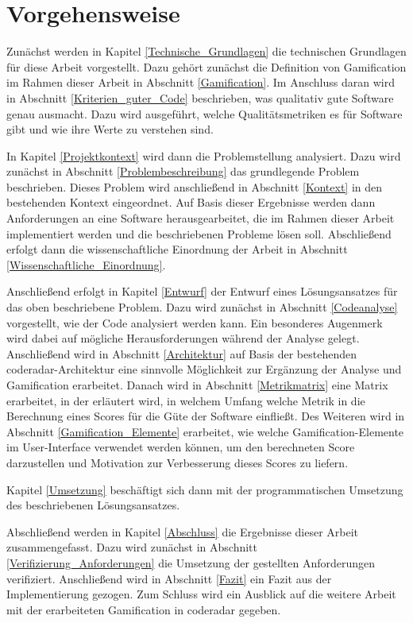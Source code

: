 \documentclass[
	oneside,  %
	ngerman, 
	final, 
	11pt, 
	a4paper, 
	1.1headlines, 
	headinclude=false, 
	footinclude=false, 
	mpinclude=false, 
	pagesize, 
	onecolumn, 
	titlepage, 
	parskip=half, 
	headsepline, 
	chapterprefix=false, 
	version=first, 
	listof=totoc, 
	bibliography=totoc, 
	toc=graduated, 
	fleqn
]{scrbook}
\begin{document}
\section{Vorgehensweise}
\label{Vorgehensweise}
Zunächst werden in Kapitel \ref{Technische_Grundlagen} die technischen Grundlagen für diese Arbeit vorgestellt.
Dazu gehört zunächst die Definition von Gamification im Rahmen dieser Arbeit in Abschnitt \ref{Gamification}.
Im Anschluss daran wird in Abschnitt \ref{Kriterien_guter_Code} beschrieben, was qualitativ gute Software genau ausmacht.
Dazu wird ausgeführt, welche Qualitätsmetriken es für Software gibt und wie ihre Werte zu verstehen sind.

In Kapitel \ref{Projektkontext} wird dann die Problemstellung analysiert.
Dazu wird zunächst in Abschnitt \ref{Problembeschreibung} das grundlegende Problem beschrieben.
Dieses Problem wird anschließend in Abschnitt \ref{Kontext} in den bestehenden Kontext eingeordnet.
Auf Basis dieser Ergebnisse werden dann Anforderungen an eine Software herausgearbeitet, die im Rahmen dieser Arbeit implementiert werden und die beschriebenen Probleme lösen soll.
Abschließend erfolgt dann die wissenschaftliche Einordnung der Arbeit in Abschnitt \ref{Wissenschaftliche_Einordnung}.

Anschließend erfolgt in Kapitel \ref{Entwurf} der Entwurf eines Lösungsansatzes für das oben beschriebene Problem.
Dazu wird zunächst in Abschnitt \ref{Codeanalyse} vorgestellt, wie der Code analysiert werden kann.
Ein besonderes Augenmerk wird dabei auf mögliche Herausforderungen während der Analyse gelegt.
Anschließend wird in Abschnitt \ref{Architektur} auf Basis der bestehenden coderadar-Architektur eine sinnvolle Möglichkeit zur Ergänzung der Analyse und Gamification erarbeitet.
Danach wird in Abschnitt \ref{Metrikmatrix} eine Matrix erarbeitet, in der erläutert wird, in welchem Umfang welche Metrik in die Berechnung eines Scores für die Güte der Software einfließt.
Des Weiteren wird in Abschnitt \ref{Gamification_Elemente} erarbeitet, wie welche Gamification-Elemente im User-Interface verwendet werden können, um den berechneten Score darzustellen und Motivation zur Verbesserung dieses Scores zu liefern.

Kapitel \ref{Umsetzung} beschäftigt sich dann mit der programmatischen Umsetzung des beschriebenen Lösungsansatzes. 

Abschließend werden in Kapitel \ref{Abschluss} die Ergebnisse dieser Arbeit zusammengefasst.
Dazu wird zunächst in Abschnitt \ref{Verifizierung_Anforderungen} die Umsetzung der gestellten Anforderungen verifiziert.
Anschließend wird in Abschnitt \ref{Fazit} ein Fazit aus der Implementierung gezogen.
Zum Schluss wird ein Ausblick auf die weitere Arbeit mit der erarbeiteten Gamification in coderadar gegeben.
\end{document}
